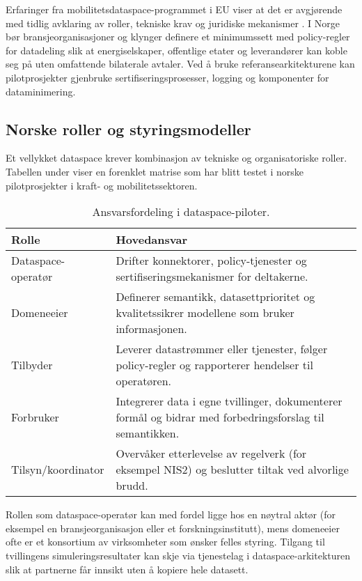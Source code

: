 Erfaringer fra mobilitetsdataspace-programmet i EU viser at det er avgjørende med tidlig avklaring av roller, tekniske krav og
juridiske mekanismer \citep{ec2023mobilitydataspace}. I Norge bør bransjeorganisasjoner og klynger definere et minimumssett med
policy-regler for datadeling slik at energiselskaper, offentlige etater og leverandører kan koble seg på uten omfattende
bilaterale avtaler. Ved å bruke referansearkitekturene kan pilotprosjekter gjenbruke sertifiseringsprosesser, logging og
komponenter for dataminimering.

\subsection{Norske roller og styringsmodeller}
Et vellykket dataspace krever kombinasjon av tekniske og organisatoriske roller. Tabellen under viser en forenklet matrise som
har blitt testet i norske pilotprosjekter i kraft- og mobilitetssektoren.

\begin{table}[ht]
    \centering
    \caption{Ansvarsfordeling i dataspace-piloter.}
    \label{tab:kap03-dataspace-ansvar}
    \begin{tabular}{p{}p{}}
        \toprule
        \textbf{Rolle} & \textbf{Hovedansvar} \\
        \midrule
        Dataspace-operatør & Drifter konnektorer, policy-tjenester og sertifiseringsmekanismer for deltakerne. \\
        Domeneeier & Definerer semantikk, datasettprioritet og kvalitetssikrer modellene som bruker informasjonen. \\
        Tilbyder & Leverer datastrømmer eller tjenester, følger policy-regler og rapporterer hendelser til operatøren. \\
        Forbruker & Integrerer data i egne tvillinger, dokumenterer formål og bidrar med forbedringsforslag til semantikken. \\
        Tilsyn/koordinator & Overvåker etterlevelse av regelverk (for eksempel NIS2) og beslutter tiltak ved alvorlige brudd. \\
        \bottomrule
    \end{tabular}
\end{table}

Rollen som dataspace-operatør kan med fordel ligge hos en nøytral aktør (for eksempel en bransjeorganisasjon eller et
forskningsinstitutt), mens domeneeier ofte er et konsortium av virksomheter som ønsker felles styring. Tilgang til tvillingens
simuleringsresultater kan skje via tjenestelag i dataspace-arkitekturen slik at partnerne får innsikt uten å kopiere hele
datasett.

